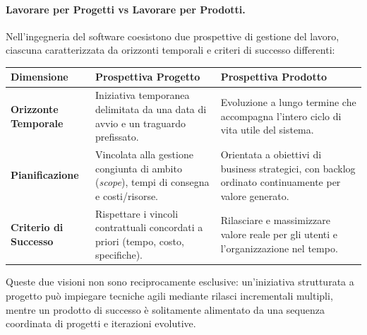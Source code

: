 \documentclass[12pt]{extarticle}
\begin{document}
\paragraph{Lavorare per Progetti vs Lavorare per Prodotti.}
Nell'ingegneria del software coesistono due prospettive di gestione del lavoro, ciascuna caratterizzata da orizzonti temporali e criteri di successo differenti:

\begin{center}
\small
\begin{tabular}{p{3.2cm}p{5.6cm}p{5.6cm}}
    \toprule
    \textbf{Dimensione} & \textbf{Prospettiva Progetto} & \textbf{Prospettiva Prodotto} \\
    \midrule
    \textbf{Orizzonte Temporale} & Iniziativa temporanea delimitata da una data di avvio e un traguardo prefissato. & Evoluzione a lungo termine che accompagna l'intero ciclo di vita utile del sistema. \\
    \addlinespace
    \textbf{Pianificazione} & Vincolata alla gestione congiunta di ambito (\textit{scope}), tempi di consegna e costi/risorse. & Orientata a obiettivi di business strategici, con backlog ordinato continuamente per valore generato. \\
    \addlinespace
    \textbf{Criterio di Successo} & Rispettare i vincoli contrattuali concordati a priori (tempo, costo, specifiche). & Rilasciare e massimizzare valore reale per gli utenti e l'organizzazione nel tempo. \\
    \bottomrule
\end{tabular}
\end{center}

\noindent Queste due visioni non sono reciprocamente esclusive: un'iniziativa strutturata a progetto può impiegare tecniche agili mediante rilasci incrementali multipli, mentre un prodotto di successo è solitamente alimentato da una sequenza coordinata di progetti e iterazioni evolutive.
\end{document}
